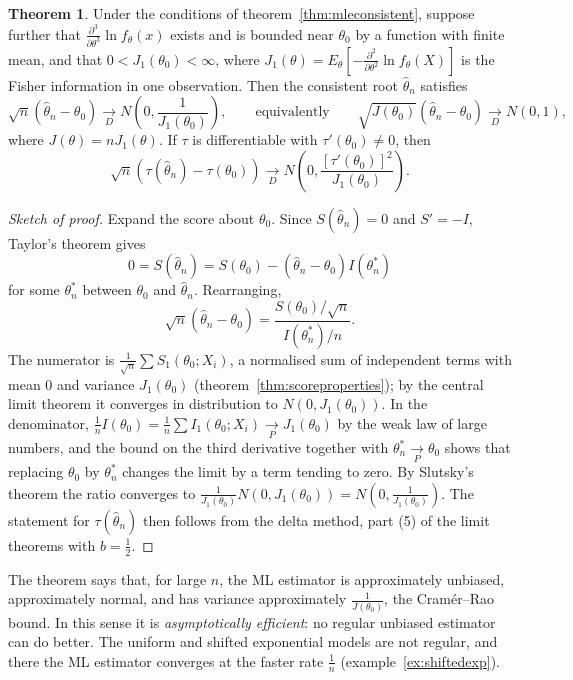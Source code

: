 \documentclass[12pt,a4paper]{report}
\theoremstyle{definition}
\newtheorem{thm}{Theorem}[section]
\begin{document}
\begin{thm}
\label{thm:mlenormal}
Under the conditions of theorem~\ref{thm:mleconsistent}, suppose further that
$\frac{\partial^3}{\partial\theta^3}\ln f_\theta(x)$ exists and is bounded near $\theta_0$
by a function with finite mean, and that $0<J_1(\theta_0)<\infty$, where
$J_1(\theta) = E_\theta\left[-\frac{\partial^2}{\partial\theta^2}\ln f_\theta(X)\right]$ is the
Fisher information in one observation. Then the consistent root $\hat\theta_n$
satisfies
\[\sqrt n\left(\hat\theta_n - \theta_0\right)\underset{D}{\longrightarrow}N\left(0, \frac{1}{J_1(\theta_0)}\right),
\qquad\text{equivalently}\qquad
\sqrt{J(\theta_0)}\left(\hat\theta_n - \theta_0\right)\underset{D}{\longrightarrow}N(0, 1),\]
where $J(\theta) = nJ_1(\theta)$. If $\tau$ is differentiable with $\tau'(\theta_0)\ne 0$,
then
\[\sqrt n\left(\tau(\hat\theta_n) - \tau(\theta_0)\right)\underset{D}{\longrightarrow}N\left(0, \frac{\left[\tau'(\theta_0)\right]^2}{J_1(\theta_0)}\right).\]
\end{thm}

\begin{proof}[Sketch of proof]
Expand the score about $\theta_0$. Since $S(\hat\theta_n) = 0$ and $S' = -I$, Taylor's
theorem gives
\[0 = S(\hat\theta_n) = S(\theta_0) - (\hat\theta_n - \theta_0)I(\theta_n^*)\]
for some $\theta_n^*$ between $\theta_0$ and $\hat\theta_n$. Rearranging,
\[\sqrt n\left(\hat\theta_n - \theta_0\right) = \frac{S(\theta_0)/\sqrt n}{I(\theta_n^*)/n} .\]
The numerator is $\frac{1}{\sqrt n}\sum S_1(\theta_0; X_i)$, a normalised sum of
independent terms with mean $0$ and variance $J_1(\theta_0)$
(theorem~\ref{thm:scoreproperties}); by the central limit theorem it converges in
distribution to $N(0, J_1(\theta_0))$. In the denominator,
$\frac1n I(\theta_0) = \frac1n\sum I_1(\theta_0; X_i)\underset{P}{\longrightarrow}J_1(\theta_0)$ by
the weak law of large numbers, and the bound on the third derivative together with
$\theta_n^*\underset{P}{\longrightarrow}\theta_0$ shows that replacing $\theta_0$ by $\theta_n^*$
changes the limit by a term tending to zero. By Slutsky's theorem the ratio
converges to $\frac{1}{J_1(\theta_0)}N(0, J_1(\theta_0)) = N\left(0, \frac{1}{J_1(\theta_0)}\right)$.
The statement for $\tau(\hat\theta_n)$ then follows from the delta method, part (5)
of the limit theorems with $b = \frac12$.
\end{proof}

The theorem says that, for large $n$, the ML estimator is approximately unbiased,
approximately normal, and has variance approximately $\frac{1}{J(\theta_0)}$, the
Cram\'er--Rao bound. In this sense it is \emph{asymptotically efficient}: no
regular unbiased estimator can do better. The uniform and shifted exponential
models are not regular, and there the ML estimator converges at the faster rate
$\frac1n$ (example~\ref{ex:shiftedexp}).
\end{document}
